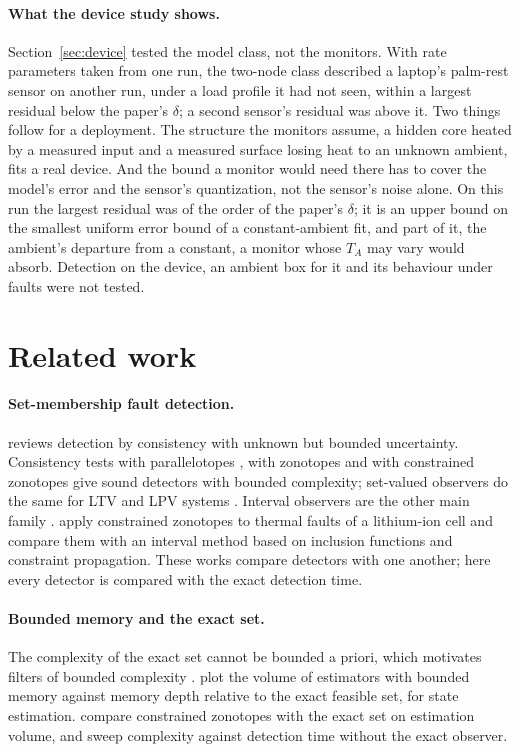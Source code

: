 \paragraph{What the device study shows.} Section~\ref{sec:device} tested the model class, not the monitors. With rate
parameters taken from one run, the two-node class described a laptop's palm-rest sensor on another run, under a load
profile it had not seen, within a largest residual below the paper's $\delta$; a second sensor's residual was above
it. Two things follow for a deployment. The structure the monitors assume, a hidden core heated by a measured input
and a measured surface losing heat to an unknown ambient, fits a real device. And the bound a monitor would need there has to cover the model's error and the sensor's quantization, not the
sensor's noise alone. On this run the largest residual was of the order of the paper's $\delta$; it is an upper bound
on the smallest uniform error bound of a constant-ambient fit, and part of it, the ambient's departure from a constant,
a monitor whose $T_A$ may vary would absorb. Detection on the device, an ambient
box for it and its behaviour under faults were not tested.

\section{Related work}\label{sec:related}

\paragraph{Set-membership fault detection.} \citet{puig2010} reviews detection by consistency with unknown but
bounded uncertainty. Consistency tests with parallelotopes \citep{ingimundarson2005}, with zonotopes
\citep{ingimundarson2009} and with constrained zonotopes \citep{scott2016} give sound detectors with bounded complexity;
set-valued observers do the same for LTV and LPV systems \citep{rosa2010,silvestre2017}. Interval observers are the
other main family \citep{pourasghar2019,tang2019}. \citet{saccani2022} apply constrained zonotopes to thermal faults of a
lithium-ion cell and compare them with an interval method based on inclusion functions and constraint propagation. These works
compare detectors with one another; here every detector is compared with the exact detection time.

\paragraph{Bounded memory and the exact set.} The complexity of the exact set cannot be bounded a priori, which
motivates filters of bounded complexity \citep{sznaier2011,blanchini2012}. \citet{casini2024} plot the volume of
estimators with bounded memory against memory depth relative to the exact feasible set, for state estimation.
\citet{scott2016} compare constrained zonotopes with the exact set on estimation volume, and sweep complexity against
detection time without the exact observer.

